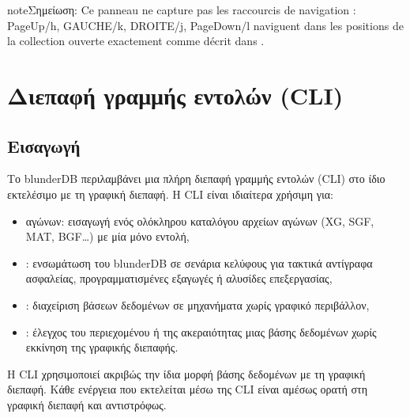 \documentclass[letterpaper,10pt,greek]{sphinxmanual}
\begin{document}
\begin{sphinxadmonition}{note}{Σημείωση:}
\sphinxAtStartPar
Ce panneau ne capture pas les raccourcis de navigation :
PageUp/h, GAUCHE/k, DROITE/j, PageDown/l naviguent dans les positions de
la collection ouverte exactement comme décrit dans
{\hyperref[\detokenize{raccourcis:raccourcis-navigation}]{}}.
\end{sphinxadmonition}

\sphinxstepscope


\section{Διεπαφή γραμμής εντολών (CLI)}
\label{\detokenize{cli:interface-en-ligne-de-commande-cli}}\label{\detokenize{cli:cli}}\label{\detokenize{cli::doc}}

\subsection{Εισαγωγή}
\label{\detokenize{cli:introduction}}
\sphinxAtStartPar
Το blunderDB περιλαμβάνει μια πλήρη διεπαφή γραμμής εντολών (CLI) στο ίδιο εκτελέσιμο με τη γραφική διεπαφή. Η CLI είναι ιδιαίτερα χρήσιμη για:
\begin{itemize}
\item {} 
\sphinxAtStartPar
{} αγώνων: εισαγωγή ενός ολόκληρου καταλόγου αρχείων αγώνων (XG, SGF, MAT, BGF…) με μία μόνο εντολή,

\item {} 
\sphinxAtStartPar
{}: ενσωμάτωση του blunderDB σε σενάρια κελύφους για τακτικά αντίγραφα ασφαλείας, προγραμματισμένες εξαγωγές ή αλυσίδες επεξεργασίας,

\item {} 
\sphinxAtStartPar
{}: διαχείριση βάσεων δεδομένων σε μηχανήματα χωρίς γραφικό περιβάλλον,

\item {} 
\sphinxAtStartPar
{}: έλεγχος του περιεχομένου ή της ακεραιότητας μιας βάσης δεδομένων χωρίς εκκίνηση της γραφικής διεπαφής.

\end{itemize}

\sphinxAtStartPar
Η CLI χρησιμοποιεί ακριβώς την ίδια μορφή βάσης δεδομένων με τη γραφική διεπαφή. Κάθε ενέργεια που εκτελείται μέσω της CLI είναι αμέσως ορατή στη γραφική διεπαφή και αντιστρόφως.
\end{document}
